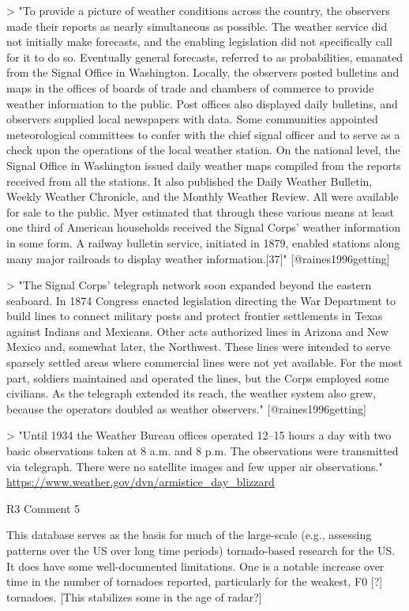 > "To provide a picture of weather conditions across the country, the observers
made their reports as nearly simultaneous as possible. The weather service did
not initially make forecasts, and the enabling legislation did not specifically
call for it to do so. Eventually general forecasts, referred to as
probabilities, emanated from the Signal Office in Washington. Locally, the
observers posted bulletins and maps in the offices of boards of trade and
chambers of commerce to provide weather information to the public. Post offices
also displayed daily bulletins, and observers supplied local newspapers with
data. Some communities appointed meteorological committees to confer with the
chief signal officer and to serve as a check upon the operations of the local
weather station. On the national level, the Signal Office in Washington issued
daily weather maps compiled from the reports received from all the stations. It
also published the Daily Weather Bulletin, Weekly Weather Chronicle, and the
Monthly Weather Review. All were available for sale to the public. Myer
estimated that through these various means at least one third of American
households received the Signal Corps' weather information in some form. A
railway bulletin service, initiated in 1879, enabled stations along many major
railroads to display weather information.[37]" [@raines1996getting]

> "The Signal Corps' telegraph network soon expanded beyond the eastern
seaboard. In 1874 Congress enacted legislation directing the War Department to
build lines to connect military posts and protect frontier settlements in Texas
against Indians and Mexicans. Other acts authorized lines in Arizona and New
Mexico and, somewhat later, the Northwest. These lines were intended to serve
sparsely settled areas where commercial lines were not yet available. For the
most part, soldiers maintained and operated the lines, but the Corps employed
some civilians. As the telegraph extended its reach, the weather system also
grew, because the operators doubled as weather observers." [@raines1996getting]

> "Until 1934 the Weather Bureau offices operated 12--15 hours a day with two
basic observations taken at 8 a.m. and 8 p.m. The observations were transmitted
via telegraph. There were no satellite images and few upper air observations."
\url{https://www.weather.gov/dvn/armistice_day_blizzard}

R3 Comment 5

This database serves as the basis for much of the large-scale (e.g., assessing
patterns over the US over long time periods) tornado-based research for the US. 
It does have some well-documented limitations. One is a notable increase over 
time in the number of tornadoes reported, particularly for the weakest, F0 [?]
tornadoes. [This stabilizes some in the age of radar?]

